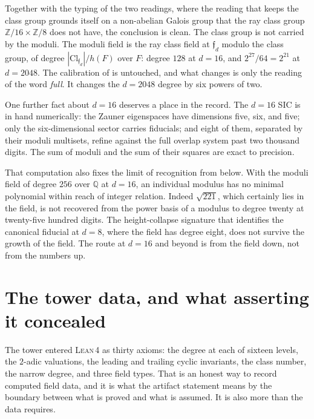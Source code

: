 \documentclass[12pt,a4paper]{article}
\newcommand{\Fd}{F}
\newcommand{\Cl}{\mathrm{Cl}}
\newcommand{\Lean}{\textsc{Lean\,4}}
\begin{document}
Together with the typing of the two readings, where the reading that keeps the
class group grounds itself on a non-abelian Galois group that the ray class
group $\mathbb{Z}/16\times\mathbb{Z}/8$ does not have, the conclusion is clean.
The class group is not carried by the moduli. The moduli field is the ray class
field at $\mathfrak{f}_d$ modulo the class group, of degree
$|\Cl_{\mathfrak{f}_d}|/h(\Fd)$ over $\Fd$: degree $128$ at $d=16$, and
$2^{27}/64 = 2^{21}$ at $d=2048$. The calibration of  is
untouched, and what changes is only the reading of the word \emph{full}. It
changes the $d=2048$ degree by six powers of two.

One further fact about $d=16$ deserves a place in the record. The $d=16$ SIC is
in hand numerically: the Zauner eigenspaces have dimensions five, six, and five;
only the six-dimensional sector carries fiducials; and eight of them, separated
by their moduli multisets, refine against the full overlap system past two
thousand digits. The sum of moduli and the sum of their squares are exact to
precision.

That computation also fixes the limit of recognition from below. With the moduli
field of degree $256$ over $\mathbb{Q}$ at $d=16$, an individual modulus has no
minimal polynomial within reach of integer relation. Indeed $\sqrt{221}$, which
certainly lies in the field, is not recovered from the power basis of a modulus
to degree twenty at twenty-five hundred digits. The height-collapse signature
that identifies the canonical fiducial at $d=8$, where the field has degree
eight, does not survive the growth of the field. The route at $d=16$ and beyond
is from the field down, not from the numbers up.

\section{The tower data, and what asserting it concealed}
\label{sec:discharge}

The tower entered \Lean{} as thirty axioms: the degree at each of sixteen
levels, the $2$-adic valuations, the leading and trailing cyclic invariants, the
class number, the narrow degree, and three field types. That is an honest way to
record computed field data, and it is what the artifact statement means by the
boundary between what is proved and what is assumed. It is also more than the
data requires.
\end{document}
